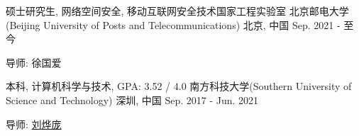 

\begin{cventries}

  \cventry
    {硕士研究生, 网络空间安全, 移动互联网安全技术国家工程实验室}
    {北京邮电大学(Beijing University of Posts and Telecommunications)}
    {北京, 中国} %
    {Sep. 2021 - 至今} %
    {
      \begin{cvitems} %
        \item {导师: 徐国爱}
      \end{cvitems}
    }
  \cventry
    {本科, 计算机科学与技术, GPA: 3.52 / 4.0} %
    {南方科技大学(Southern University of Science and Technology)} %
    {深圳, 中国} %
    {Sep. 2017 - Jun. 2021} %
    {
      \begin{cvitems} %
        \item {导师: \href{https://yepangliu.github.io/}{刘烨庞}}
      \end{cvitems}
    }

\end{cventries}
